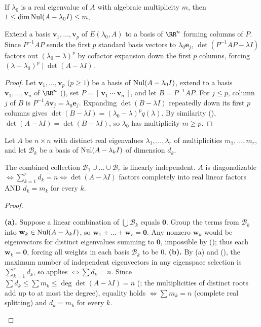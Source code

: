 \documentclass[10pt]{scrartcl}
\newcommand{\vv}[1]{\mathbf{#1}}
\begin{document}
\begin{theorem*}
  If $\lambda_0$ is a real eigenvalue of $A$ with algebraic multiplicity $m$, then $1\le \dim\operatorname{Nul}(A-\lambda_0 I)\le m$.
\end{theorem*}
\begin{ideabox}
  Extend a basis $\vv v_1,\dots,\vv v_p$ of $E(\lambda_0,A)$ to a basis of $\RR^n$ forming columns of $P$. Since $P^{-1}AP$ sends the first $p$ standard basis vectors to $\lambda_0\vv e_j$, $\det(P^{-1}AP-\lambda I)$ factors out $(\lambda_0-\lambda)^p$ by cofactor expansion down the first $p$ columns, forcing $(\lambda-\lambda_0)^p \mid \det(A-\lambda I)$.
\end{ideabox}
\begin{proof}
  Let $\vv v_1,\dots,\vv v_p$ ($p\ge 1$) be a basis of $\operatorname{Nul}(A-\lambda_0 I)$, extend to a basis $\vv v_1,\dots,\vv v_n$ of $\RR^n$ (), set $P=[\,\vv v_1\ \cdots\ \vv v_n\,]$, and let $B=P^{-1}AP$. For $j\le p$, column~$j$ of $B$ is $P^{-1}A\vv v_j=\lambda_0\vv e_j$. Expanding $\det(B-\lambda I)$ repeatedly down its first $p$ columns gives $\det(B-\lambda I)=(\lambda_0-\lambda)^p q(\lambda)$. By similarity (), $\det(A-\lambda I)=\det(B-\lambda I)$, so $\lambda_0$ has multiplicity $m\ge p$.
\end{proof}

\begin{theorem*}
  Let $A$ be $n\times n$ with distinct real eigenvalues $\lambda_1,\dots,\lambda_r$ of multiplicities $m_1,\dots,m_r$, and let $\mathcal B_k$ be a basis of $\operatorname{Nul}(A-\lambda_k I)$ of dimension $d_k$.
  \begin{enumerate}
    \ii[(a)] The combined collection $\mathcal B_1\cup\dots\cup\mathcal B_r$ is linearly independent.
    \ii[(b)] $A$ is diagonalizable $\iff \sum_{k=1}^r d_k = n \iff \det(A-\lambda I)$ factors completely into real linear factors AND $d_k=m_k$ for every $k$.
  \end{enumerate}
\end{theorem*}
\begin{proof}
  \begin{steps}
    \ii \textbf{(a).} Suppose a linear combination of $\bigcup\mathcal B_k$ equals $\vv 0$. Group the terms from $\mathcal B_k$ into $\vv w_k\in\Nul(A-\lambda_k I)$, so $\vv w_1+\dots+\vv w_r=\vv 0$. Any nonzero $\vv w_k$ would be eigenvectors for distinct eigenvalues summing to $\vv 0$, impossible by (); thus each $\vv w_k=\vv 0$, forcing all weights in each basis $\mathcal B_k$ to be $0$.
    \ii \textbf{(b).} By (a) and (), the maximum number of independent eigenvectors in any eigenspace selection is $\sum_{k=1}^r d_k$, so  applies $\iff \sum d_k=n$. Since $\sum d_k \le \sum m_k \le \deg\det(A-\lambda I)=n$ (; the multiplicities of distinct roots add up to at most the degree), equality holds $\iff \sum m_k=n$ (complete real splitting) and $d_k=m_k$ for every $k$.
  \end{steps}
\end{proof}
\end{document}
